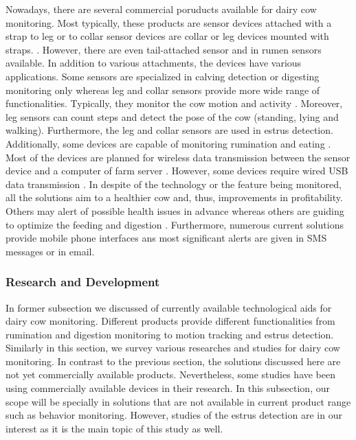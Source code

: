 \documentclass[english,12pt,a4paper,pdftex,elec,utf8]{aaltothesis}
\begin{document}
Nowadays, there are several commercial poruducts available for dairy cow monitoring. Most typically, these products are sensor devices attached with a strap to leg \cite{iceroboticproductbrochure,geacowscout} or to collar \cite{heatime,geacowscout,moocall} sensor devices are collar or leg devices mounted with straps. \cite{heatime, iceroboticproductbrochure}. However, there are even tail-attached sensor \cite{moocall} and in rumen \cite{wellcowbolus} sensors available. In addition to various attachments, the devices have various applications. Some sensors are specialized in calving detection \cite{moocall} or digesting monitoring \cite{wellcowbolus} only whereas leg and collar sensors provide more wide range of functionalities. Typically, they monitor the cow motion and activity \cite{iceroboticproductbrochure, heatime, geacowscout, moocall}. Moreover, leg sensors can count steps and detect the pose of the cow (standing, lying and walking). Furthermore, the leg and collar sensors are used in estrus detection. Additionally, some devices are capable of monitoring rumination \cite{heatime} and eating \cite{geacowscout}. Most of the devices are planned for wireless data transmission between the sensor device and a computer of farm server \cite{heatime, geacowscout, iceroboticproductbrochure, wellcowbolus}. However, some devices require wired USB data transmission \cite{iceroboticproductbrochure}. In despite of the technology or the feature being monitored, all the solutions aim to a healthier cow and, thus, improvements in profitability. Others may alert of possible health issues in advance \cite{heatime, geacowscout, iceroboticproductbrochure} whereas others are guiding to optimize the feeding and digestion \cite{wellcowbolus}. Furthermore, numerous current solutions provide mobile phone interfaces ans most significant alerts are given in SMS messages or in email.


\subsubsection{Research and Development} \label{researchanddevelopmentsection}

In former subsection we discussed of currently available technological aids for dairy cow monitoring. Different products provide different functionalities from rumination and digestion monitoring to motion tracking and estrus detection. Similarly in this section, we survey various researches and studies for dairy cow monitoring. In contrast to the previous section, the solutions discussed here are not yet commercially available products. Nevertheless, some studies have been using commercially available devices in their research. In this subsection, our scope will be specially in solutions that are not available in current product range such as behavior monitoring. However, studies of the estrus detection are in our interest as it is the main topic of this study as well. 
\end{document}
